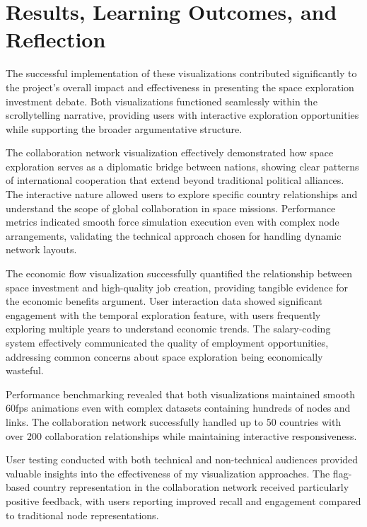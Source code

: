 \documentclass[conference]{IEEEtran}
\begin{document}
\section{Results, Learning Outcomes, and Reflection}

The successful implementation of these visualizations contributed significantly to the project's overall impact and effectiveness in presenting the space exploration investment debate. Both visualizations functioned seamlessly within the scrollytelling narrative, providing users with interactive exploration opportunities while supporting the broader argumentative structure.

The collaboration network visualization effectively demonstrated how space exploration serves as a diplomatic bridge between nations, showing clear patterns of international cooperation that extend beyond traditional political alliances. The interactive nature allowed users to explore specific country relationships and understand the scope of global collaboration in space missions. Performance metrics indicated smooth force simulation execution even with complex node arrangements, validating the technical approach chosen for handling dynamic network layouts.

The economic flow visualization successfully quantified the relationship between space investment and high-quality job creation, providing tangible evidence for the economic benefits argument. User interaction data showed significant engagement with the temporal exploration feature, with users frequently exploring multiple years to understand economic trends. The salary-coding system effectively communicated the quality of employment opportunities, addressing common concerns about space exploration being economically wasteful.

Performance benchmarking revealed that both visualizations maintained smooth 60fps animations even with complex datasets containing hundreds of nodes and links. The collaboration network successfully handled up to 50 countries with over 200 collaboration relationships while maintaining interactive responsiveness.

User testing conducted with both technical and non-technical audiences provided valuable insights into the effectiveness of my visualization approaches. The flag-based country representation in the collaboration network received particularly positive feedback, with users reporting improved recall and engagement compared to traditional node representations.
\end{document}
